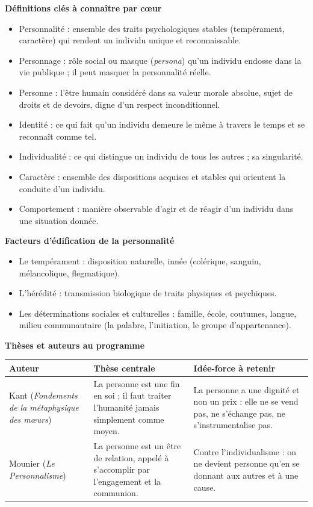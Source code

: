 \documentclass[11pt]{article}
\newcommand{\cle}[1]{{\popxbold\color{popdark}#1}}
\begin{document}
\begin{bilan}
\textbf{Définitions clés à connaître par cœur}
\begin{itemize}
  \item \cle{Personnalité} : ensemble des traits psychologiques stables (tempérament, caractère) qui rendent un individu unique et reconnaissable.
  \item \cle{Personnage} : rôle social ou masque (\emph{persona}) qu'un individu endosse dans la vie publique ; il peut masquer la personnalité réelle.
  \item \cle{Personne} : l'être humain considéré dans sa valeur morale absolue, sujet de droits et de devoirs, digne d'un respect inconditionnel.
  \item \cle{Identité} : ce qui fait qu'un individu demeure le même à travers le temps et se reconnaît comme tel.
  \item \cle{Individualité} : ce qui distingue un individu de tous les autres ; sa singularité.
  \item \cle{Caractère} : ensemble des dispositions acquises et stables qui orientent la conduite d'un individu.
  \item \cle{Comportement} : manière observable d'agir et de réagir d'un individu dans une situation donnée.
\end{itemize}

\textbf{Facteurs d'édification de la personnalité}
\begin{itemize}
  \item Le \cle{tempérament} : disposition naturelle, innée (colérique, sanguin, mélancolique, flegmatique).
  \item L'\cle{hérédité} : transmission biologique de traits physiques et psychiques.
  \item Les \cle{déterminations sociales et culturelles} : famille, école, coutumes, langue, milieu communautaire (la palabre, l'initiation, le groupe d'appartenance).
\end{itemize}

\textbf{Thèses et auteurs au programme}
\begin{center}
\begin{tabularx}{\linewidth}{|l|X|X|}
\hline
\rowcolor{popblueL} \textbf{Auteur} & \textbf{Thèse centrale} & \textbf{Idée-force à retenir} \\
\hline
Kant (\emph{Fondements de la métaphysique des mœurs}) & La personne est une \cle{fin en soi} ; il faut traiter l'humanité jamais simplement comme moyen. & La personne a une \cle{dignité} et non un prix : elle ne se vend pas, ne s'échange pas, ne s'instrumentalise pas. \\
\hline
Mounier (\emph{Le Personnalisme}) & La personne est un être de relation, appelé à s'accomplir par l'\cle{engagement} et la communion. & Contre l'individualisme : on ne devient personne qu'en se donnant aux autres et à une cause. \\
\hline
\end{tabularx}
\end{center}


\end{bilan}
\end{document}
